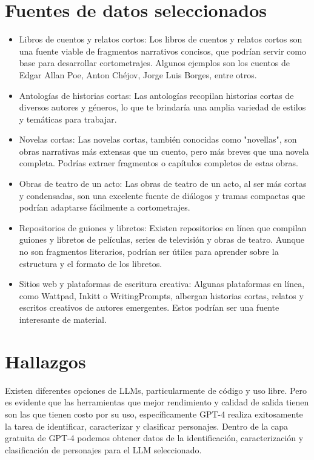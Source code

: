 \documentclass[journal,onecolumn]{IEEEtran}
\begin{document}
	\section{Fuentes de datos seleccionados}
	\begin{itemize}
		\item Libros de cuentos y relatos cortos: Los libros de cuentos y relatos cortos son una fuente viable de fragmentos narrativos concisos, que podrían servir como base para desarrollar cortometrajes. Algunos ejemplos son los cuentos de Edgar Allan Poe, Anton Chéjov, Jorge Luis Borges, entre otros.
		\item Antologías de historias cortas: Las antologías recopilan historias cortas de diversos autores y géneros, lo que te brindaría una amplia variedad de estilos y temáticas para trabajar.
		\item Novelas cortas: Las novelas cortas, también conocidas como "novellas", son obras narrativas más extensas que un cuento, pero más breves que una novela completa. Podrías extraer fragmentos o capítulos completos de estas obras.
		\item Obras de teatro de un acto: Las obras de teatro de un acto, al ser más cortas y condensadas, son una excelente fuente de diálogos y tramas compactas que podrían adaptarse fácilmente a cortometrajes.
		\item Repositorios de guiones y libretos: Existen repositorios en línea que compilan guiones y libretos de películas, series de televisión y obras de teatro. Aunque no son fragmentos literarios, podrían ser útiles para aprender sobre la estructura y el formato de los libretos.
		\item Sitios web y plataformas de escritura creativa: Algunas plataformas en línea, como Wattpad, Inkitt o WritingPrompts, albergan historias cortas, relatos y escritos creativos de autores emergentes. Estos podrían ser una fuente interesante de material.
	\end{itemize}
	\section{Hallazgos}
	Existen diferentes opciones de LLMs, particularmente de código y uso libre. Pero es evidente que las herramientas que mejor rendimiento y calidad de salida tienen son las que tienen costo por su uso, específicamente GPT-4 realiza exitosamente la tarea de identificar, caracterizar y clasificar personajes.
	Dentro de la capa gratuita de GPT-4 podemos obtener datos de la identificación, caracterización y clasificación de personajes para el LLM seleccionado.
\end{document}
